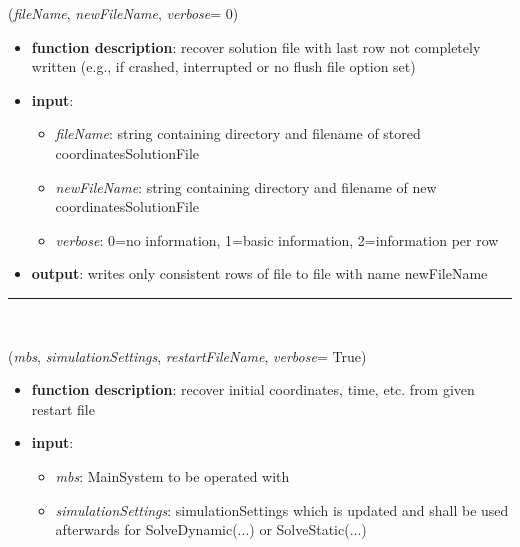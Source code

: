 \begin{itemize}[leftmargin=1.4cm]
\begin{itemize}[leftmargin=1.4cm]
\begin{itemize}[leftmargin=1.4cm]
\begin{itemize}[leftmargin=0.5cm]
\begin{flushleft}
\label{sec:basicUtilities:RecoverSolutionFile}
({\it fileName}, {\it newFileName}, {\it verbose}= 0)
\end{flushleft}
\setlength{\itemindent}{0.7cm}
\begin{itemize}[leftmargin=0.7cm]
\item[--]
{\bf function description}: recover solution file with last row not completely written (e.g., if crashed, interrupted or no flush file option set)
\item[--]
{\bf input}: \vspace{-6pt}
\begin{itemize}[leftmargin=1.2cm]
\setlength{\itemindent}{-0.7cm}
\item[]{\it fileName}: string containing directory and filename of stored coordinatesSolutionFile
\item[]{\it newFileName}: string containing directory and filename of new coordinatesSolutionFile
\item[]{\it verbose}: 0=no information, 1=basic information, 2=information per row
\end{itemize}
\item[--]
{\bf output}: writes only consistent rows of file to file with name newFileName
\vspace{12pt}\end{itemize}
%
\noindent\rule{8cm}{0.75pt}\vspace{1pt} \\ 
\begin{flushleft}
\label{sec:basicUtilities:InitializeFromRestartFile}
({\it mbs}, {\it simulationSettings}, {\it restartFileName}, {\it verbose}= True)
\end{flushleft}
\setlength{\itemindent}{0.7cm}
\begin{itemize}[leftmargin=0.7cm]
\item[--]
{\bf function description}: recover initial coordinates, time, etc. from given restart file
\item[--]
{\bf input}: \vspace{-6pt}
\begin{itemize}[leftmargin=1.2cm]
\setlength{\itemindent}{-0.7cm}
\item[]{\it mbs}: MainSystem to be operated with
\item[]{\it simulationSettings}: simulationSettings which is updated and shall be used afterwards for SolveDynamic(...) or SolveStatic(...)

\end{itemize}
\end{itemize}
\end{itemize}
\end{itemize}
\end{itemize}
\end{itemize}
